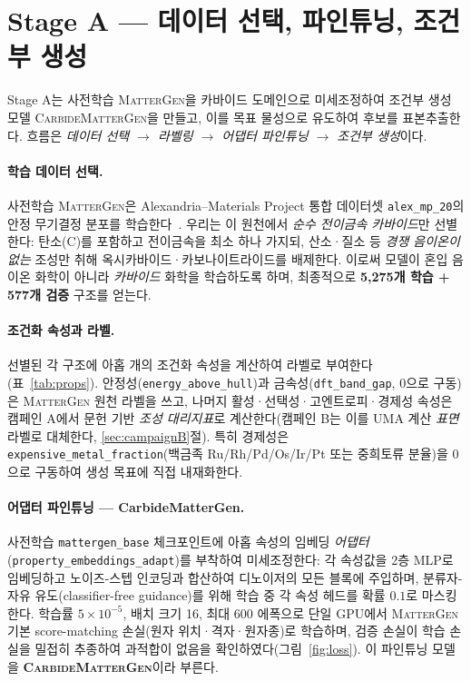 \documentclass[11pt,a4paper]{report}
\begin{document}
\section{Stage A --- 데이터 선택, 파인튜닝, 조건부 생성}
\label{sec:methods-stageA}
Stage A는 사전학습 \textsc{MatterGen}을 카바이드 도메인으로 미세조정하여 조건부 생성 모델
\textsc{CarbideMatterGen}을 만들고, 이를 목표 물성으로 유도하여 후보를 표본추출한다. 흐름은
\emph{데이터 선택 $\to$ 라벨링 $\to$ 어댑터 파인튜닝 $\to$ 조건부 생성}이다.

\paragraph{학습 데이터 선택.} 사전학습 \textsc{MatterGen}은 Alexandria--Materials Project 통합
데이터셋 \texttt{alex\_mp\_20}의 안정 무기결정 분포를 학습한다~\cite{zeni2025}. 우리는 이 원천에서
\emph{순수 전이금속 카바이드}만 선별한다: 탄소(C)를 포함하고 전이금속을 최소 하나 가지되, 산소·질소
등 \emph{경쟁 음이온이 없는} 조성만 취해 옥시카바이드·카보나이트라이드를 배제한다. 이로써 모델이
혼입 음이온 화학이 아니라 \emph{카바이드} 화학을 학습하도록 하며, 최종적으로 \textbf{5{,}275개 학습 +
577개 검증} 구조를 얻는다.

\paragraph{조건화 속성과 라벨.} 선별된 각 구조에 아홉 개의 조건화 속성을 계산하여 라벨로 부여한다
(표~\ref{tab:props}). 안정성(\texttt{energy\_above\_hull})과 금속성(\texttt{dft\_band\_gap}, 0으로 구동)은
\textsc{MatterGen} 원천 라벨을 쓰고, 나머지 활성·선택성·고엔트로피·경제성 속성은 캠페인 A에서 문헌
기반 \emph{조성 대리지표}로 계산한다(캠페인 B는 이를 UMA 계산 \emph{표면} 라벨로 대체한다,
\ref{sec:campaignB}절). 특히 경제성은 \texttt{expensive\_metal\_fraction}(백금족 Ru/Rh/Pd/Os/Ir/Pt
또는 중희토류 분율)을 0으로 구동하여 생성 목표에 직접 내재화한다.

\paragraph{어댑터 파인튜닝 --- CarbideMatterGen.} 사전학습 \texttt{mattergen\_base} 체크포인트에 아홉
속성의 임베딩 \emph{어댑터}(\texttt{property\_embeddings\_adapt})를 부착하여 미세조정한다: 각 속성값을
2층 MLP로 임베딩하고 노이즈-스텝 인코딩과 합산하여 디노이저의 모든 블록에 주입하며, 분류자-자유
유도(classifier-free guidance)를 위해 학습 중 각 속성 헤드를 확률 $0.1$로 마스킹한다. 학습률
$5\times10^{-5}$, 배치 크기 16, 최대 600 에폭으로 단일 GPU에서 \textsc{MatterGen} 기본 score-matching
손실(원자 위치·격자·원자종)로 학습하며, 검증 손실이 학습 손실을 밀접히 추종하여 과적합이 없음을
확인하였다(그림~\ref{fig:loss}). 이 파인튜닝 모델을 \textbf{\textsc{CarbideMatterGen}}이라 부른다.
\end{document}
